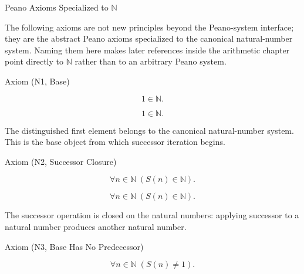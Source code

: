 \begin{topicbox}{Peano Axioms Specialized to \texorpdfstring{$\mathbb{N}$}{N}}
\begin{exposition}
The following axioms are not new principles beyond the Peano-system interface;
they are the abstract Peano axioms specialized to the canonical natural-number
system. Naming them here makes later references inside the arithmetic chapter
point directly to $\mathbb{N}$ rather than to an arbitrary Peano system.
\end{exposition}

\begin{axiombox}{Axiom (N1, Base)}
\begin{axiom}[N1, Base]
\label{ax:n-base}
\[
1 \in \mathbb{N}.
\]
\end{axiom}
\end{axiombox}

\begin{remark*}
\[
1 \in \mathbb{N}.
\]
\end{remark*}

\begin{remark*}[Interpretation]
The distinguished first element belongs to the canonical natural-number
system. This is the base object from which successor iteration begins.
\end{remark*}

\NoLocalDependencies

\begin{axiombox}{Axiom (N2, Successor Closure)}
\begin{axiom}
\label{ax:n-successor-closure}
\[
\forall n \in \mathbb{N}\;(S(n)\in \mathbb{N}).
\]
\end{axiom}
\end{axiombox}

\begin{remark*}
\[
\forall n \in \mathbb{N}\;(S(n)\in \mathbb{N}).
\]
\end{remark*}

\begin{remark*}[Interpretation]
The successor operation is closed on the natural numbers: applying successor
to a natural number produces another natural number.
\end{remark*}

\NoLocalDependencies

\begin{axiombox}{Axiom (N3, Base Has No Predecessor)}
\begin{axiom}
\label{ax:n-base-has-no-predecessor}
\[
\forall n \in \mathbb{N}\;(S(n)\ne 1).
\]
\end{axiom}
\end{axiombox}


\end{topicbox}
